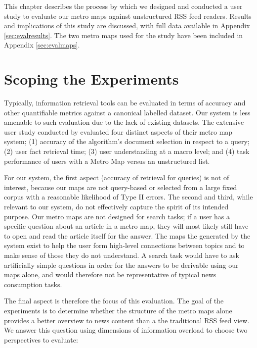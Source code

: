 This chapter describes the process by which we designed and conducted a user study to evaluate our metro maps against unstructured RSS feed readers. Results and implications of this study are discussed, with full data available in Appendix \ref{sec:evalresults}. The two metro maps used for the study have been included in Appendix  \ref{sec:evalmaps}.

\section{Scoping the Experiments}

Typically, information retrieval tools can be evaluated in terms of  accuracy and other quantifiable metrics against a canonical labelled dataset. Our system is less amenable to such evaluation due to the lack of existing datasets. The extensive user study conducted by \cite{GeneratingInformationMaps} evaluated four distinct aspects of their metro map system; (1) accuracy of the algorithm's document selection in respect to a query; (2) user fact retrieval time; (3) user understanding at a macro level; and (4) task performance of users with a Metro Map versus an unstructured list.

For our system, the first aspect (accuracy of retrieval for queries) is not of interest, because our maps are not query-based or selected from a large fixed corpus with a reasonable likelihood of Type II errors. The second and third, while relevant to our system, do not effectively capture the spirit of its intended purpose. Our metro maps are not designed for search tasks; if a user has a specific question about an article in a metro map, they will most likely still have to open and read the article itself for the answer. The maps the generated by the system exist to help the user form high-level connections between topics and to make sense of those they do not understand. A search task would have to ask artificially simple questions in order for the answers to be derivable using our maps alone, and would therefore not be representative of typical news consumption tasks.

The final aspect is therefore the focus of this evaluation. The goal of the experiments is to determine whether the structure of the metro maps alone provides a better overview to news content than a the traditional RSS feed view. We answer this question using  dimensions of information overload to choose two perspectives to evaluate:

